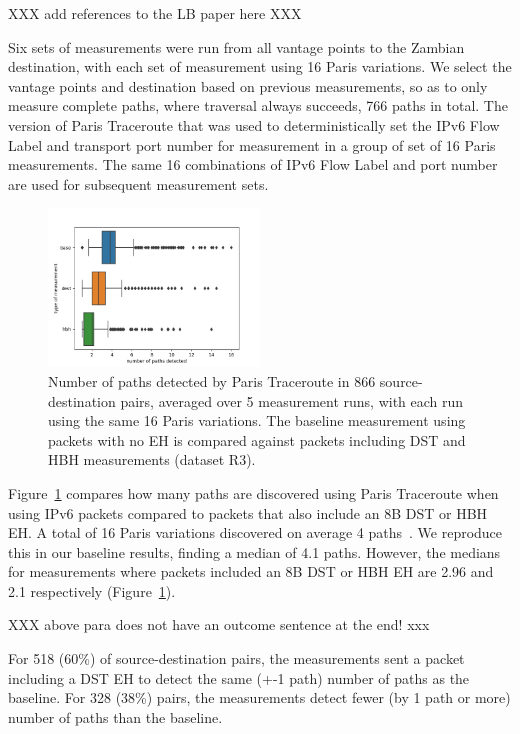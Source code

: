 \documentclass[conference]{IEEEtran}
\begin{document}
XXX add references to the LB paper  here XXX

Six sets of measurements were run from all vantage points to the Zambian destination, with each set of measurement using 16 Paris variations. We select the vantage points and destination based on previous measurements, so as to only measure complete paths, where traversal always succeeds, 766 paths in total. The version of Paris Traceroute that was used to deterministically set the IPv6 Flow Label and transport port number for measurement in a group of set of 16 Paris measurements. The same 16 combinations of IPv6 Flow Label and port number are used for subsequent measurement sets.

\begin{figure}
\centering
  \includegraphics[width=0.5\textwidth]{boxplot-paths-detected.png}
  \caption{Number of paths detected by Paris Traceroute in 866 source-destination pairs, averaged over 5 measurement runs, with each run using the same 16 Paris variations. The baseline measurement using packets with no EH is compared against packets including DST and HBH measurements (dataset R3).}
  \label{fig:paths-detected}
\end{figure}

Figure~\ref{fig:paths-detected} compares how many paths are discovered using Paris Traceroute when using IPv6 packets compared to packets that also include an 8B DST or HBH EH.
A total of 16 Paris variations discovered on average 4 paths~\cite{augustin2006avoiding}. We reproduce this in our baseline results, finding a median of 4.1 paths. However, the medians for measurements where packets included an 8B DST or HBH EH are 2.96 and 2.1 respectively (Figure~\ref{fig:paths-detected}).

XXX above para does not have an outcome sentence at the end! xxx

For 518 (60\%) of source-destination pairs, the measurements sent a packet including a DST EH to detect the same (+-1 path) number of paths as the baseline. For 328 (38\%) pairs, the measurements detect fewer (by 1 path or more) number of paths than the baseline. 
\end{document}
